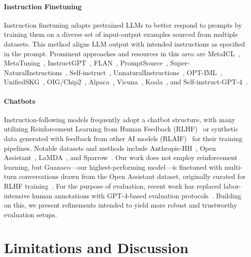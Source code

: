 \paragraph{Instruction Finetuning} Instruction finetuning adapts pretrained LLMs to better respond to prompts by training them on a diverse set of input-output examples sourced from multiple datasets. This method aligns LLM output with intended instructions as specified in the prompt. Prominent approaches and resources in this area are MetaICL~\citep{min2021metaicl}, MetaTuning~\citep{zhong2021adapting}, InstructGPT~\citep{ouyang2022training}, FLAN~\citep{wei2021finetuned,chung2022scaling}, PromptSource~\citep{bach2022promptsource}, Super-NaturalInstructions~\citep{wang2022super,sanh2021multitask}, Self-instruct~\citep{wang2022self}, UnnaturalInstructions~\citep{honovich2022unnatural}, OPT-IML~\citep{iyer2022opt}, UnifiedSKG~\citep{xie2022unifiedskg}, OIG/Chip2~\citep{laion2023}, Alpaca~\citep{alpaca}, Vicuna~\citep{vicuna2023}, Koala~\citep{koala_blogpost_2023}, and Self-instruct-GPT-4~\citep{peng2023instruction}.

\paragraph{Chatbots} Instruction-following models frequently adopt a chatbot structure, with many utilizing Reinforcement Learning from Human Feedback (RLHF)~\citep{christiano2017deep} or synthetic data generated with feedback from other AI models (RLAIF)~\citep{bai2022constitutional} for their training pipelines. Notable datasets and methods include Anthropic-HH~\citep{askell2021general,bai2022training}, Open Assistant~\citep{kopf2023openassistant}, LaMDA~\citep{thoppilan2022lamda}, and Sparrow~\citep{glaese2022improving}. Our work does not employ reinforcement learning, but Guanaco—our highest-performing model—is finetuned with multi-turn conversations drawn from the Open Assistant dataset, originally curated for RLHF training~\citep{kopf2023openassistant}. For the purpose of evaluation, recent work has replaced labor-intensive human annotations with GPT-4-based evaluation protocols~\citep{vicuna2023,peng2023instruction}. Building on this, we present refinements intended to yield more robust and trustworthy evaluation setups.

\section{Limitations and Discussion}

